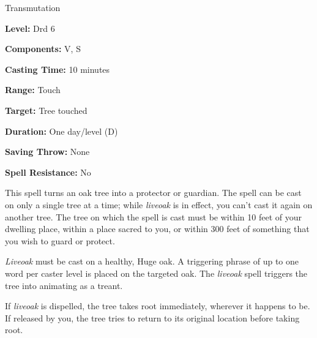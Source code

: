
Transmutation

\textbf{Level:} Drd 6

\textbf{Components:} V, S

\textbf{Casting Time:} 10 minutes

\textbf{Range:} Touch

\textbf{Target:} Tree touched

\textbf{Duration:} One day/level (D)

\textbf{Saving Throw:} None

\textbf{Spell Resistance:} No

This spell turns an oak tree into a protector or guardian. The spell can be cast 
on only a single tree at a time; while \textit{liveoak} is in effect, you can't 
cast it again on another tree. The tree on which the spell is cast must be within 
10 feet of your dwelling place, within a place sacred to you, or within 300 feet 
of something that you wish to guard or protect.

\textit{Liveoak} must be cast on a healthy, Huge oak. A triggering phrase of up 
to one word per caster level is placed on the targeted oak. The \textit{liveoak 
}spell triggers the tree into animating as a treant. 

If \textit{liveoak} is dispelled, the tree takes root immediately, wherever it 
happens to be. If released by you, the tree tries to return to its original location 
before taking root.

